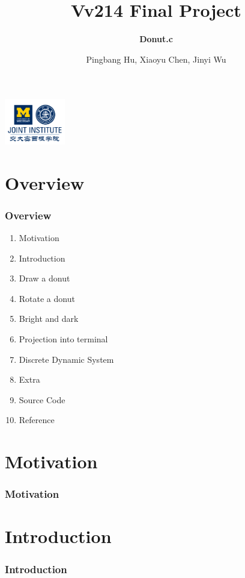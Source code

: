 \documentclass[12pt, t]{beamer}
\title{Vv214 Final Project}
\subtitle{\textbf{Donut.c}}
\institute[UM-SJTU JI]{University of Michigan-Shanghai Jiao Tong University Joint Institute}
\author{Pingbang Hu, Xiaoyu Chen, Jinyi Wu}
\begin{document}
\begin{frame}
    \titlepage
    \begin{center}
        \includegraphics[height=2cm]{Figures/logo/logo2.png}
    \end{center}
\end{frame}

\section{Overview}
    \begin{frame}
        \frametitle{Overview}
        \begin{enumerate}
            \item Motivation
            \item Introduction
            \item Draw a donut
            \item Rotate a donut
            \item Bright and dark
            \item Projection into terminal
            \item Discrete Dynamic System
            \item Extra
            \item Source Code
            \item Reference
        \end{enumerate}
    \end{frame}


\section{Motivation}
\begin{frame}
    \frametitle{Motivation}

\end{frame}


\section{Introduction}
\begin{frame}
    \frametitle{Introduction}

\end{frame}
\end{document}
